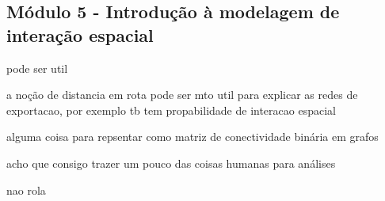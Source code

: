 \subsection{Módulo 5 - Introdução à modelagem de interação espacial}

pode ser util

a noção de distancia em rota pode ser mto util para explicar as redes de exportacao, por exemplo
tb tem propabilidade de interacao espacial

alguma coisa para repsentar como matriz de conectividade binária em grafos

acho que consigo trazer um pouco das coisas humanas para análises

nao rola



